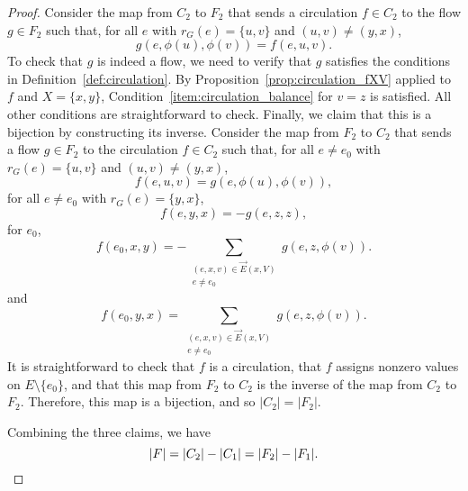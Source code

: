 \begin{proof}
	Consider the map from \(C_2\) to \(F_2\) that sends a circulation \(f \in C_2\)
	to the flow \(g \in F_2\) such that, for all \(e\) with \(r_G(e) = \{u, v\}\) and \((u, v) \neq (y, x)\),
	\begin{equation}
		g(e, \phi(u), \phi(v)) = f(e, u, v).
	\end{equation}
	To check that \(g\) is indeed a flow, we need to verify that \(g\) satisfies the conditions in Definition~\ref{def:circulation}.
	By Proposition~\ref{prop:circulation_fXV} applied to \(f\) and \(X = \{x, y\}\), Condition~\ref{item:circulation_balance} for \(v = z\) is satisfied.
	All other conditions are straightforward to check.
	Finally, we claim that this is a bijection by constructing its inverse.
	Consider the map from \(F_2\) to \(C_2\) that sends a flow \(g \in F_2\)
	to the circulation \(f \in C_2\) such that,
	for all \(e \neq e_0\) with \(r_G(e) = \{u, v\}\) and \((u, v) \neq (y, x)\),
	\begin{equation}
		f(e, u, v) = g(e, \phi(u), \phi(v)),
	\end{equation}
	for all \(e \neq e_0\) with \(r_G(e) = \{y, x\}\),
	\begin{equation}
		f(e, y, x) = -g(e, z, z),
	\end{equation}
	for \(e_0\),
	\begin{equation}
		f(e_0, x, y) = - \sum_{\substack{(e, x, v) \in \vec{E}(x, V) \\ e \neq e_0}} g(e, z, \phi(v)).
	\end{equation}
	and
	\begin{equation}
		f(e_0, y, x) = \sum_{\substack{(e, x, v) \in \vec{E}(x, V) \\ e \neq e_0}} g(e, z, \phi(v)).
	\end{equation}
	It is straightforward to check that \(f\) is a circulation, that \(f\) assigns nonzero values on \(E \setminus \{e_0\}\), and that this map from \(F_2\) to \(C_2\) is the inverse of the map from \(C_2\) to \(F_2\).
	Therefore, this map is a bijection, and so \(|C_2| = |F_2|\).

	Combining the three claims, we have
	\begin{equation}
		|F| = |C_2| - |C_1| = |F_2| - |F_1|. \qedhere
	\end{equation}
\end{proof}

